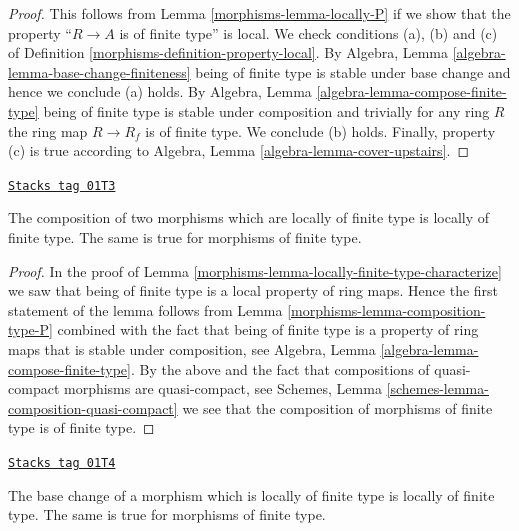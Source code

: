 \begin{proof}

This follows from Lemma \ref{morphisms-lemma-locally-P} if we show that
the property ``$R \to A$ is of finite type'' is local.
We check conditions (a), (b) and (c) of Definition
\ref{morphisms-definition-property-local}.
By Algebra, Lemma \ref{algebra-lemma-base-change-finiteness}
being of finite type is stable under base change and hence
we conclude (a) holds. By Algebra, Lemma
\ref{algebra-lemma-compose-finite-type} being of finite type
is stable under composition and trivially for any ring
$R$ the ring map $R \to R_f$ is of finite type.
We conclude (b) holds. Finally, property (c) is true
according to Algebra, Lemma \ref{algebra-lemma-cover-upstairs}.
\end{proof}

\begin{lemma}
\label{morphisms-lemma-composition-finite-type}
\href{https://stacks.math.columbia.edu/tag/01T3}{\texttt{Stacks tag 01T3}}

The composition of two morphisms which are locally of finite type is
locally of finite type. The same is true for morphisms of finite type.
\end{lemma}

\begin{proof}

In the proof of Lemma \ref{morphisms-lemma-locally-finite-type-characterize}
we saw that being of finite type is a local property of ring maps.
Hence the first statement of the lemma follows from
Lemma \ref{morphisms-lemma-composition-type-P} combined
with the fact that being of finite type is a property of ring maps that is
stable under composition, see
Algebra, Lemma \ref{algebra-lemma-compose-finite-type}.
By the above and the fact that compositions of
quasi-compact morphisms are quasi-compact, see
Schemes, Lemma \ref{schemes-lemma-composition-quasi-compact}
we see that the composition of morphisms of finite type is
of finite type.
\end{proof}

\begin{lemma}
\label{morphisms-lemma-base-change-finite-type}
\href{https://stacks.math.columbia.edu/tag/01T4}{\texttt{Stacks tag 01T4}}

The base change of a morphism which is locally of finite type
is locally of finite type. The same is true for morphisms of
finite type.
\end{lemma}

